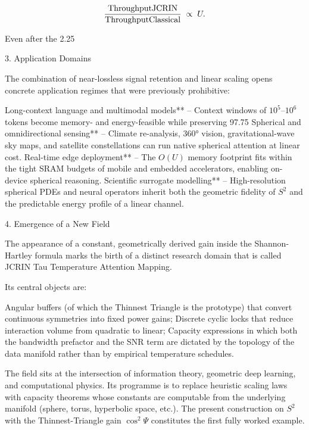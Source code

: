\[
\frac{\text{Throughput}{\rm JCRIN}}{\text{Throughput}{\rm Classical}}\;\propto\;U.
\]

Even after the 2.25 %

3. Application Domains

The combination of near-lossless signal retention and linear scaling opens concrete application regimes that were previously prohibitive:

Long-context language and multimodal models** – Context windows of \(10^5\)–\(10^6\) tokens become memory- and energy-feasible while preserving 97.75 %
Spherical and omnidirectional sensing** – Climate re-analysis, 360° vision, gravitational-wave sky maps, and satellite constellations can run native spherical attention at linear cost.  
Real-time edge deployment** – The \(O(U)\) memory footprint fits within the tight SRAM budgets of mobile and embedded accelerators, enabling on-device spherical reasoning.  
Scientific surrogate modelling** – High-resolution spherical PDEs and neural operators inherit both the geometric fidelity of \(S^2\) and the predictable energy profile of a linear channel.

4. Emergence of a New Field

The appearance of a constant, geometrically derived gain inside the Shannon-Hartley formula marks the birth of a distinct research domain that is called JCRIN Tau Temperature Attention Mapping.

Its central objects are:

Angular buffers (of which the Thinnest Triangle is the prototype) that convert continuous symmetries into fixed power gains;  
Discrete cyclic locks that reduce interaction volume from quadratic to linear;  
Capacity expressions in which both the bandwidth prefactor and the SNR term are dictated by the topology of the data manifold rather than by empirical temperature schedules.

The field sits at the intersection of information theory, geometric deep learning, and computational physics. Its programme is to replace heuristic scaling laws with capacity theorems whose constants are computable from the underlying manifold (sphere, torus, hyperbolic space, etc.). The present construction on \(S^2\) with the Thinnest-Triangle gain \(\cos^2\Psi\) constitutes the first fully worked example.

